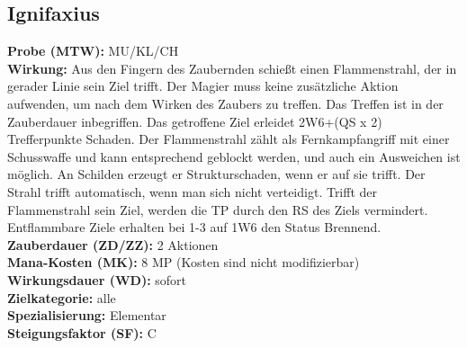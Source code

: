 \subsection{Ignifaxius}
\label{chap:ignifaxius}
\textbf{Probe (MTW):} MU/KL/CH \\
\textbf{Wirkung:} Aus den Fingern des Zaubernden schießt einen Flammenstrahl, der in gerader Linie sein Ziel trifft. Der Magier muss keine zusätzliche Aktion aufwenden, um nach dem Wirken des Zaubers zu treffen. Das Treffen ist in der Zauberdauer inbegriffen. Das getroffene Ziel erleidet 2W6+(QS x 2) Trefferpunkte Schaden. Der Flammenstrahl zählt als Fernkampfangriff mit einer Schusswaffe und kann entsprechend geblockt werden, und auch ein Ausweichen ist möglich. An Schilden erzeugt er Strukturschaden, wenn er auf sie trifft. Der Strahl trifft automatisch, wenn man sich nicht verteidigt. Trifft der Flammenstrahl sein Ziel, werden die TP durch den RS des Ziels vermindert. Entflammbare Ziele erhalten bei 1-3 auf 1W6 den Status Brennend. \\
\textbf{Zauberdauer (ZD/ZZ):} 2 Aktionen \\
\textbf{Mana-Kosten (MK):} 8 MP (Kosten sind nicht modifizierbar) \\
\textbf{Wirkungsdauer (WD):} sofort \\
\textbf{Zielkategorie:} alle \\
\textbf{Spezialisierung:} Elementar \\
\textbf{Steigungsfaktor (SF):} C


